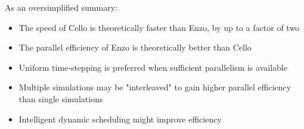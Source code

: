 As an oversimplified summary:

\begin{itemize}
\item The speed of Cello is theoretically faster than Enzo, by up to a
  factor of two
\item The parallel efficiency of Enzo is theoretically better than
  Cello
\item Uniform time-stepping is preferred when sufficient parallelism
  is available
\item Multiple simulations may be "interleaved" to gain higher
  parallel efficiency than single simulations
\item Intelligent dynamic scheduling might improve efficiency
\end{itemize}
